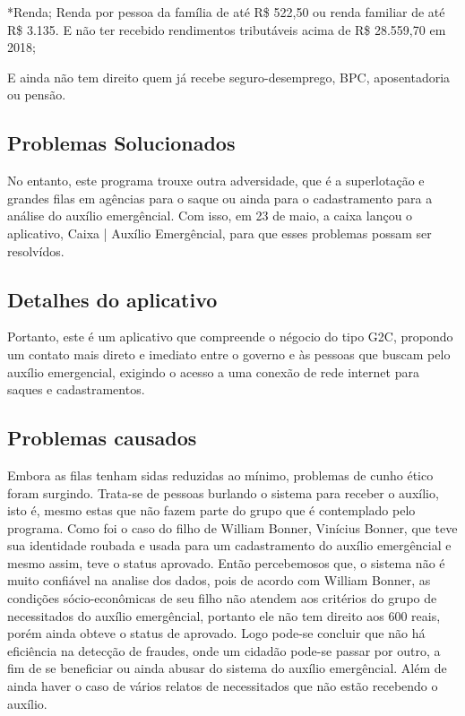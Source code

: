 \documentclass[12pt]{article}
\begin{document}
*Renda; Renda por pessoa da família de até R\$ 522,50 ou renda familiar de até R\$ 3.135. E não ter recebido rendimentos tributáveis acima de R\$ 28.559,70 em 2018;

E ainda não tem direito quem já recebe seguro-desemprego, BPC, aposentadoria ou pensão.

\subsection{Problemas Solucionados}
	No entanto, este programa trouxe outra adversidade, que é a superlotação e grandes filas em agências para o saque ou ainda para o cadastramento para a análise do auxílio emergêncial. Com isso, em 23 de maio, a caixa lançou o aplicativo, Caixa | Auxílio Emergêncial, para que esses problemas possam ser resolvídos.

\subsection{Detalhes do aplicativo}
	Portanto, este é um aplicativo que compreende o négocio do tipo G2C, propondo um contato mais direto e imediato entre o governo e às pessoas que buscam pelo auxílio emergencial, exigindo o acesso a uma conexão de rede internet para saques e cadastramentos.
\subsection{Problemas causados}
	Embora as filas tenham sidas reduzidas ao mínimo, problemas de cunho ético foram surgindo. Trata-se de pessoas burlando o sistema para receber o auxílio, isto é, mesmo estas que não fazem parte do grupo que é contemplado pelo programa. Como foi o caso do filho de William Bonner, Vinícius Bonner, que teve sua identidade roubada e usada para um cadastramento do auxílio emergêncial e mesmo assim, teve o status aprovado.
\linebreak
\linebreak
	Então percebemosos que, o sistema não é muito confiável na analise dos dados, pois de acordo com William Bonner, as condições sócio-econômicas de seu filho não atendem aos critérios do grupo de necessitados do auxílio emergêncial, portanto ele não tem direito aos 600 reais, porém ainda obteve o status de aprovado. Logo pode-se concluir que não há eficiência na detecção de fraudes, onde um cidadão pode-se passar por outro, a fim de se beneficiar ou ainda abusar do sistema do auxílio emergêncial. Além de ainda haver o caso de vários relatos de necessitados que não estão recebendo o auxílio.
\end{document}
